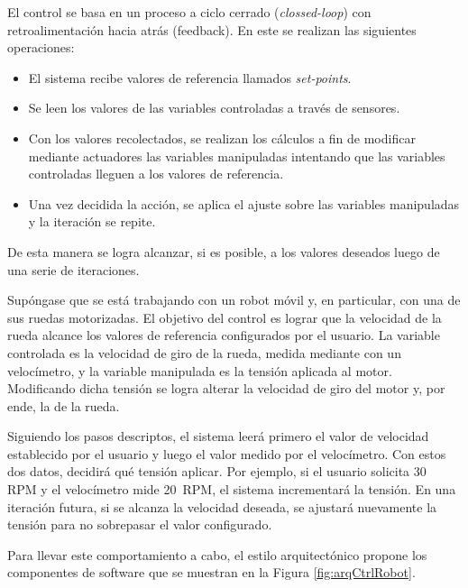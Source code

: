 El control se basa en un proceso a ciclo cerrado (\textit{clossed-loop}) con retroalimentación hacia atrás (feedback). En este se realizan las siguientes operaciones:
\begin{itemize}
\item El sistema recibe valores de referencia llamados \textit{set-points}.
\item Se leen los valores de las variables controladas a través de sensores.
\item Con los valores recolectados, se realizan los cálculos a fin de modificar mediante actuadores las variables manipuladas intentando que las variables controladas lleguen a los valores de referencia.
\item Una vez decidida la acción, se aplica el ajuste sobre las variables manipuladas y la iteración se repite.
\end{itemize}

De esta manera se logra alcanzar, si es posible, a los valores deseados luego de una serie de iteraciones.

Supóngase que se está trabajando con un robot móvil y, en particular, con una de sus ruedas motorizadas. El objetivo del control es lograr que la velocidad de la rueda alcance los valores de referencia configurados por el usuario. La variable controlada es la velocidad de giro de la rueda, medida mediante con un velocímetro, y la variable manipulada es la tensión aplicada al motor. Modificando dicha tensión se logra alterar la velocidad de giro del motor y, por ende, la de la rueda.

Siguiendo los pasos descriptos, el sistema leerá primero el valor de velocidad establecido por el usuario y luego el valor medido por el velocímetro. Con estos dos datos, decidirá qué tensión aplicar. Por ejemplo, si el usuario solicita 30  \gls{RPM} y el velocímetro mide 20  \gls{RPM}, el sistema incrementará la tensión. En una iteración futura, si se alcanza la velocidad deseada, se ajustará nuevamente la tensión para no sobrepasar el valor configurado.

Para llevar este comportamiento a cabo, el estilo arquitectónico propone los componentes de software que se muestran en la Figura \ref{fig:arqCtrlRobot}.


